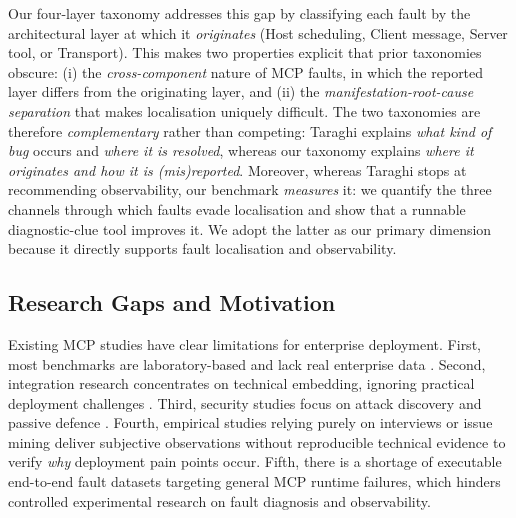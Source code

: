 Our four-layer taxonomy addresses this gap by classifying each fault by the architectural layer
at which it \emph{originates} (Host scheduling, Client message, Server tool, or Transport). This
makes two properties explicit that prior taxonomies obscure: (i) the \emph{cross-component}
nature of MCP faults, in which the reported layer differs from the originating layer, and (ii)
the \emph{manifestation-root-cause separation} that makes localisation uniquely difficult. The
two taxonomies are therefore \emph{complementary} rather than competing: Taraghi explains
\emph{what kind of bug} occurs and \emph{where it is resolved}, whereas our taxonomy explains
\emph{where it originates and how it is (mis)reported}. Moreover, whereas Taraghi stops at
recommending observability, our benchmark \emph{measures} it: we quantify the three channels
through which faults evade localisation and show that a runnable diagnostic-clue tool improves
it. We adopt the latter as our primary dimension because it directly supports fault
localisation and observability.

\subsection{Research Gaps and Motivation}

Existing MCP studies have clear limitations for enterprise deployment. First, most
benchmarks are laboratory-based and lack real enterprise data \cite{liu2025mcpeval}.
Second, integration research concentrates on technical embedding, ignoring practical
deployment challenges \cite{xu2025towards}\cite{li2025energyplus}. Third, security studies
focus on attack discovery and passive defence \cite{hasan2025model}. Fourth, empirical
studies relying purely on interviews or issue mining deliver subjective observations without
reproducible technical evidence to verify \emph{why} deployment pain points occur. Fifth,
there is a shortage of executable end-to-end fault datasets targeting general MCP runtime
failures, which hinders controlled experimental research on fault diagnosis and
observability.